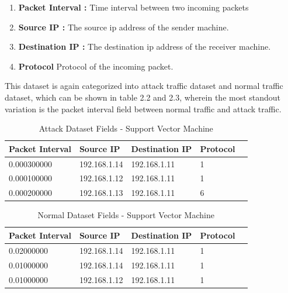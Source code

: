 \documentclass[12pt,a4paper,final]{report}
\begin{document}
\begin{enumerate}
\item
\textbf{Packet Interval :}
\newline
Time interval between two incoming packets

\item
\textbf{Source IP :}
\newline
The source ip address of the sender machine.

\item
\textbf{Destination IP :}
\newline
The destination ip address of the receiver machine.

\item
\textbf{Protocol}
\newline
Protocol of the incoming packet.
\end{enumerate}

This dataset is again categorized into attack traffic dataset and normal traffic dataset, which can be shown in table 2.2 and 2.3, wherein the most standout variation is the packet interval field between normal traffic and attack traffic.
\begin{table}[h]
\begin{center}
\begin{tabular}{|p{3cm}|p{3cm}|p{4cm}|p{3.5cm}|p{4cm}|}
\hline 
\textbf{Packet Interval} & \textbf{Source IP} & \textbf{Destination IP} & \textbf{Protocol} \\ 
\hline 
0.000300000 & 192.168.1.14 & 192.168.1.11 & 1 \\ 
\hline
0.000100000 & 192.168.1.12 & 192.168.1.11 & 1 \\ 
\hline
0.000200000 & 192.168.1.13 & 192.168.1.11 & 6 \\ 
\hline
\end{tabular} 
\end{center}
\caption{Attack Dataset Fields - Support Vector Machine}
\end{table}

\newpage
\begin{table}[h]
\begin{center}
\begin{tabular}{|p{3cm}|p{3cm}|p{4cm}|p{3.5cm}|p{4cm}|}
\hline 
\textbf{Packet Interval} & \textbf{Source IP} & \textbf{Destination IP} & \textbf{Protocol} \\ 
\hline 
0.02000000 & 192.168.1.14 & 192.168.1.11 & 1 \\ 
\hline
0.01000000 & 192.168.1.14 & 192.168.1.11 & 1 \\ 
\hline
0.01000000 & 192.168.1.12 & 192.168.1.11 & 1 \\ 
\hline
\end{tabular} 
\end{center}
\caption{Normal Dataset Fields - Support Vector Machine}
\end{table}
\end{document}
